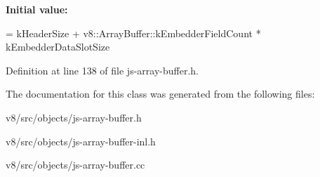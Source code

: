 {\bfseries Initial value\+:}
\begin{DoxyCode}
=
      kHeaderSize +
      v8::ArrayBuffer::kEmbedderFieldCount * kEmbedderDataSlotSize
\end{DoxyCode}


Definition at line 138 of file js-\/array-\/buffer.\+h.



The documentation for this class was generated from the following files\+:\begin{DoxyCompactItemize}
\item 
v8/src/objects/js-\/array-\/buffer.\+h\item 
v8/src/objects/js-\/array-\/buffer-\/inl.\+h\item 
v8/src/objects/js-\/array-\/buffer.\+cc\end{DoxyCompactItemize}
